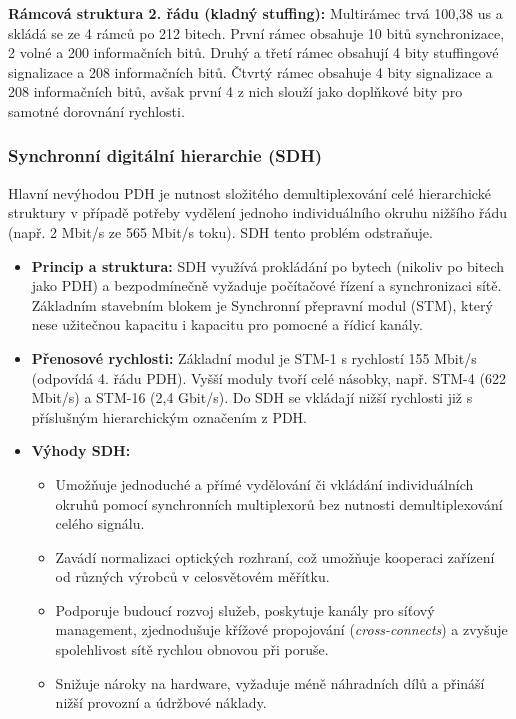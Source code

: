        \textbf{Rámcová struktura 2. řádu (kladný stuffing):} Multirámec trvá 100,38 us a skládá se ze 4 rámců po 212 bitech. První rámec obsahuje 10 bitů synchronizace, 2 volné a 200 informačních bitů. Druhý a třetí rámec obsahují 4 bity stuffingové signalizace a 208 informačních bitů. Čtvrtý rámec obsahuje 4 bity signalizace a 208 informačních bitů, avšak první 4 z nich slouží jako doplňkové bity pro samotné dorovnání rychlosti.
    \subsubsection{Synchronní digitální hierarchie (SDH)}
        Hlavní nevýhodou PDH je nutnost složitého demultiplexování celé hierarchické struktury v případě potřeby vydělení jednoho individuálního okruhu nižšího řádu (např. 2 Mbit/s ze 565 Mbit/s toku). SDH tento problém odstraňuje.
        
        \begin{itemize}
            \item \textbf{Princip a struktura:} SDH využívá prokládání po bytech (nikoliv po bitech jako PDH) a bezpodmínečně vyžaduje počítačové řízení a synchronizaci sítě. Základním stavebním blokem je Synchronní přepravní modul (STM), který nese užitečnou kapacitu i kapacitu pro pomocné a řídicí kanály.
            \item \textbf{Přenosové rychlosti:} Základní modul je STM-1 s rychlostí 155 Mbit/s (odpovídá 4. řádu PDH). Vyšší moduly tvoří celé násobky, např. STM-4 (622 Mbit/s) a STM-16 (2,4 Gbit/s). Do SDH se vkládají nižší rychlosti již s příslušným hierarchickým označením z PDH.
            \item \textbf{Výhody SDH:}
            \begin{itemize}
                \item Umožňuje jednoduché a přímé vydělování či vkládání individuálních okruhů pomocí synchronních multiplexorů bez nutnosti demultiplexování celého signálu.
                \item Zavádí normalizaci optických rozhraní, což umožňuje kooperaci zařízení od různých výrobců v celosvětovém měřítku.
                \item Podporuje budoucí rozvoj služeb, poskytuje kanály pro síťový management, zjednodušuje křížové propojování (\textit{cross-connects}) a zvyšuje spolehlivost sítě rychlou obnovou při poruše.
                \item Snižuje nároky na hardware, vyžaduje méně náhradních dílů a přináší nižší provozní a údržbové náklady.
            \end{itemize}
        \end{itemize}